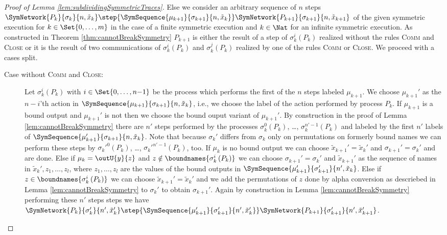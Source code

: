 \documentclass[11pt,techReport]{eptcs}
\begin{document}
\begin{proof}[Proof of Lemma \ref{lem:subdividingSymmetricTraces}]
	Else we consider an arbitrary sequence of $ n $ steps $ \SymNetwork{P_k}{\sigma_k}{n, \tilde{x}_k} \step{\SymSequence{\mu_{k{+}1}}{\sigma_{k{+}1}}{n, \tilde{x}_k}} \SymNetwork{P_{k{+}1}}{\sigma_{k{+}1}}{n, \tilde{x}_{k{+}1}} $ of the given symmetric execution for $ k \in \Set{0, \ldots, m} $ in the case of a finite symmetric execution and $ k \in \Nat $ for an infinite symmetric execution. As constructed in Theorem \ref{thm:cannotBreakSymmetry} $ P_{k{+}1} $ is either the result of a step of $ \sigma_k^i\left( P_k \right) $ realized without the rules \textsc{Comm} and \textsc{Close} or it is the result of two communications of $ \sigma_k^i\left( P_k \right) $ and $ \sigma_k^j\left( P_k \right) $ realized by one of the rules \textsc{Comm} or \textsc{Close}. We proceed with a cases split.
	\begin{description}
		\item[Case without \textsc{Comm} and \textsc{Close}:] Let $ \sigma_k^i\left( P_k \right) $ with $ i \in \Set{ 0, \ldots, n{-}1 } $ be the process which performs the first of the $ n $ steps labeled $ \mu_{k{+}1} $. We choose $ \mu_{k{+}1}' $ as the $ n{-}i $'th action in $ \SymSequence{\mu_{k{+}1}}{\sigma_{k{+}1}}{n, \tilde{x}_k} $, i.e., we choose the label of the action performed by process $ P_k $. If $ \mu_{k{+}1} $ is a bound output and $ \mu_{k{+}1}' $ is not then we choose the bound ouput variant of $\mu_{k{+}1}' $. By construction in the proof of Lemma \ref{lem:cannotBreakSymmetry} there are $ n' $ steps performed by the processes $ \sigma_k^0\left( P_k \right) $, \ldots, $ \sigma_k^{n'{-}1}\left( P_k \right) $ and labeled by the first $ n' $ labels of $ \SymSequence{\mu_{k{+}1}'}{\sigma_{k{+}1}}{n, \tilde{x}_k} $. Note that because $ \sigma_k' $ differs from $ \sigma_k $ only on permutations on formerly bound names we can perform these steps by $ {\sigma_k'}^0\left( P_k \right) $, \ldots, $ {\sigma_k'}^{n'{-}1}\left( P_k \right) $, too. If $ \mu_k $ is no bound output we can choose $ \tilde{x}_{k{+}1}' = \tilde{x}_k' $ and $ \sigma_{k{+}1}' = \sigma_k' $ and are done. Else if $ \mu_k = \outU{y}{z} $ and $ z \notin \boundnames{\sigma_k^i\left( P_k \right)} $ we can choose $ \sigma_{k{+}1}' = \sigma_k' $ and $ \tilde{x}_{k{+}1}' $ as the sequence of names in $ \tilde{x}_k', z_1, \ldots, z_l $, where $ z_1, \ldots, z_l $ are the values of the bound outputs in $ \SymSequence{\mu_{k{+}1}'}{\sigma_{k{+}1}'}{n', \tilde{x}_k} $. Else if $ z \in \boundnames{\sigma_k^i\left( P_k \right)} $ we can choose $ \tilde{x}_{k{+}1}' = \tilde{x}_k' $ and we add the permutations of $ z $ done by alpha conversion as descriebed in Lemma \ref{lem:cannotBreakSymmetry} to $ \sigma_k' $ to obtain $ \sigma_{k{+}1}' $. Again by construction in Lemma \ref{lem:cannotBreakSymmetry} performing these $ n' $ steps steps we have $ \SymNetwork{P_k}{\sigma_k'}{n', \tilde{x}_k'} \step{\SymSequence{\mu_{k{+}1}'}{\sigma_{k{+}1}'}{n', \tilde{x}_k'}} \SymNetwork{P_{k{+}1}}{\sigma_{k{+}1}'}{n', \tilde{x}_{k{+}1}'} $.

\end{description}
\end{proof}
\end{document}
